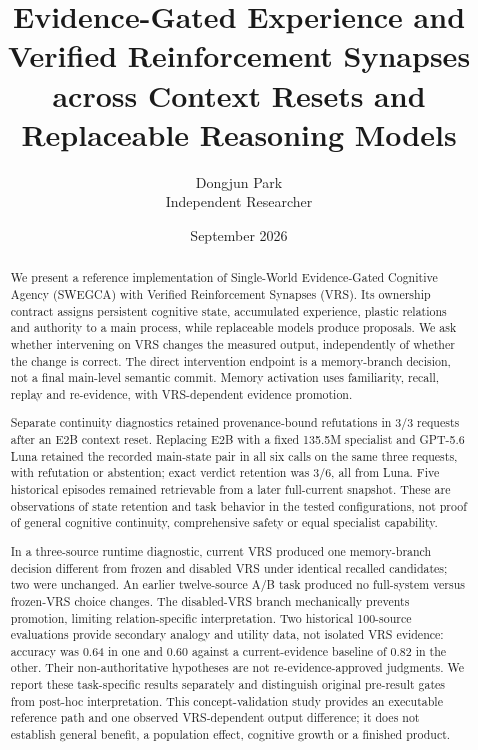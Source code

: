 \documentclass[11pt]{article}
\title{Evidence-Gated Experience and Verified Reinforcement Synapses\\
across Context Resets and Replaceable Reasoning Models}
\author{Dongjun Park\\Independent Researcher}
\date{September 2026}
\begin{document}
\maketitle

\begin{abstract}
We present a reference implementation of Single-World Evidence-Gated Cognitive Agency (SWEGCA) with Verified Reinforcement Synapses (VRS). Its ownership contract assigns persistent cognitive state, accumulated experience, plastic relations and authority to a main process, while replaceable models produce proposals. We ask whether intervening on VRS changes the measured output, independently of whether the change is correct. The direct intervention endpoint is a memory-branch decision, not a final main-level semantic commit. Memory activation uses familiarity, recall, replay and re-evidence, with VRS-dependent evidence promotion.

Separate continuity diagnostics retained provenance-bound refutations in 3/3 requests after an E2B context reset. Replacing E2B with a fixed 135.5M specialist and GPT-5.6 Luna retained the recorded main-state pair in all six calls on the same three requests, with refutation or abstention; exact verdict retention was 3/6, all from Luna. Five historical episodes remained retrievable from a later full-current snapshot. These are observations of state retention and task behavior in the tested configurations, not proof of general cognitive continuity, comprehensive safety or equal specialist capability.

In a three-source runtime diagnostic, current VRS produced one memory-branch decision different from frozen and disabled VRS under identical recalled candidates; two were unchanged. An earlier twelve-source A/B task produced no full-system versus frozen-VRS choice changes. The disabled-VRS branch mechanically prevents promotion, limiting relation-specific interpretation. Two historical 100-source evaluations provide secondary analogy and utility data, not isolated VRS evidence: accuracy was 0.64 in one and 0.60 against a current-evidence baseline of 0.82 in the other. Their non-authoritative hypotheses are not re-evidence-approved judgments. We report these task-specific results separately and distinguish original pre-result gates from post-hoc interpretation. This concept-validation study provides an executable reference path and one observed VRS-dependent output difference; it does not establish general benefit, a population effect, cognitive growth or a finished product.
\end{abstract}
\end{document}
